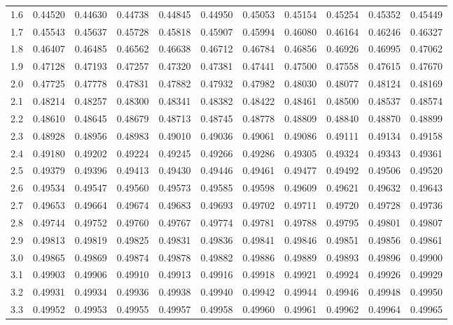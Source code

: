 \begin{table}[H]
\begin{tabular}{r|ccccc|ccccc}
\hline
  1.6 & 0.44520 & 0.44630 & 0.44738 & 0.44845 & 0.44950 & 0.45053 & 0.45154 & 0.45254 & 0.45352 & 0.45449 \\ 
  1.7 & 0.45543 & 0.45637 & 0.45728 & 0.45818 & 0.45907 & 0.45994 & 0.46080 & 0.46164 & 0.46246 & 0.46327 \\ 
  1.8 & 0.46407 & 0.46485 & 0.46562 & 0.46638 & 0.46712 & 0.46784 & 0.46856 & 0.46926 & 0.46995 & 0.47062 \\ 
  1.9 & 0.47128 & 0.47193 & 0.47257 & 0.47320 & 0.47381 & 0.47441 & 0.47500 & 0.47558 & 0.47615 & 0.47670 \\ 
  2.0 & 0.47725 & 0.47778 & 0.47831 & 0.47882 & 0.47932 & 0.47982 & 0.48030 & 0.48077 & 0.48124 & 0.48169 \\ 
\hline
  2.1 & 0.48214 & 0.48257 & 0.48300 & 0.48341 & 0.48382 & 0.48422 & 0.48461 & 0.48500 & 0.48537 & 0.48574 \\ 
  2.2 & 0.48610 & 0.48645 & 0.48679 & 0.48713 & 0.48745 & 0.48778 & 0.48809 & 0.48840 & 0.48870 & 0.48899 \\ 
  2.3 & 0.48928 & 0.48956 & 0.48983 & 0.49010 & 0.49036 & 0.49061 & 0.49086 & 0.49111 & 0.49134 & 0.49158 \\ 
  2.4 & 0.49180 & 0.49202 & 0.49224 & 0.49245 & 0.49266 & 0.49286 & 0.49305 & 0.49324 & 0.49343 & 0.49361 \\ 
  2.5 & 0.49379 & 0.49396 & 0.49413 & 0.49430 & 0.49446 & 0.49461 & 0.49477 & 0.49492 & 0.49506 & 0.49520 \\ 
\hline
  2.6 & 0.49534 & 0.49547 & 0.49560 & 0.49573 & 0.49585 & 0.49598 & 0.49609 & 0.49621 & 0.49632 & 0.49643 \\ 
  2.7 & 0.49653 & 0.49664 & 0.49674 & 0.49683 & 0.49693 & 0.49702 & 0.49711 & 0.49720 & 0.49728 & 0.49736 \\ 
  2.8 & 0.49744 & 0.49752 & 0.49760 & 0.49767 & 0.49774 & 0.49781 & 0.49788 & 0.49795 & 0.49801 & 0.49807 \\ 
  2.9 & 0.49813 & 0.49819 & 0.49825 & 0.49831 & 0.49836 & 0.49841 & 0.49846 & 0.49851 & 0.49856 & 0.49861 \\ 
  3.0 & 0.49865 & 0.49869 & 0.49874 & 0.49878 & 0.49882 & 0.49886 & 0.49889 & 0.49893 & 0.49896 & 0.49900 \\ 
\hline
  3.1 & 0.49903 & 0.49906 & 0.49910 & 0.49913 & 0.49916 & 0.49918 & 0.49921 & 0.49924 & 0.49926 & 0.49929 \\ 
  3.2 & 0.49931 & 0.49934 & 0.49936 & 0.49938 & 0.49940 & 0.49942 & 0.49944 & 0.49946 & 0.49948 & 0.49950 \\ 
  3.3 & 0.49952 & 0.49953 & 0.49955 & 0.49957 & 0.49958 & 0.49960 & 0.49961 & 0.49962 & 0.49964 & 0.49965 \\ 

\end{tabular}
\end{table}
